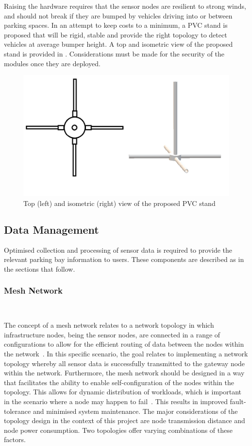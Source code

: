 \documentclass[10pt,twocolumn]{witseiepaper}
\begin{document}
		Raising the hardware requires that the sensor nodes are resilient to strong winds, and should not break if they are bumped by vehicles driving into or between parking spaces. In an attempt to keep costs to a minimum, a PVC stand is proposed that will be rigid, stable and provide the right topology to detect vehicles at average bumper height. A top and isometric view of the proposed stand is provided in . Considerations must be made for the security of the modules once they are deployed.
		
		\begin{figure}
			\centering
			\includegraphics[width=1\columnwidth]{media/topIsoStand.png}
			\caption{Top (left) and isometric (right) view of the proposed PVC stand}
			\raggedright
			\label{fig:stand}
		\end{figure}
	
	\subsection{Data Management}
	
		Optimised collection and processing of sensor data is required to provide the relevant parking bay information to users. These components are described as in the sections that follow.
		
		\subsubsection{Mesh Network} $   $
		
			The concept of a mesh network relates to a network topology in which infrastructure nodes, being the sensor nodes, are connected in a range of configurations to allow for the efficient routing of data between the nodes within the network~\cite{mesh}. In this specific scenario, the goal relates to implementing a network topology whereby all sensor data is successfully transmitted to the gateway node within the network. Furthermore, the mesh network should be designed in a way that facilitates the ability to enable self-configuration of the nodes within the topology. This allows for dynamic distribution of workloads, which is important in the scenario where a node may happen to fail~\cite{mesh}. This results in improved fault-tolerance and minimised system maintenance. The major considerations of the topology design in the context of this project are node transmission distance and node power consumption. Two topologies offer varying combinations of these factors.
			
\end{document}
